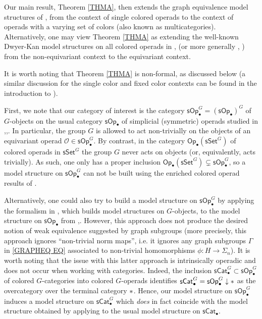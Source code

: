 \documentclass[a4paper,10pt
 ,final
]{article}%
\numberwithin{equation}{section}
\numberwithin{figure}{section}
\theoremstyle{definition} %
\renewcommand{\O}{\ensuremath{\mathcal O}}
\newcommand{\1}{\ensuremath{\mathbbm 1}}%
\begin{document}
Our main result, Theorem \ref{THMA}, 
then extends the graph equivalence model structures of
\cite[Thm. I]{BP_geo}, \cite[Thm. 3.1]{GW18}
from the context of single colored operads 
to the context of operads with a varying set of colors
(also known as multicategories).
Alternatively, one may view Theorem \ref{THMA} as extending the well-known Dwyer-Kan model structures on all colored operads
in \cite[Thm 1.14]{CM13b}, \cite[Thm. 2]{Rob} (or more generally \cite{Cav}, \cite{Yau})
from the non-equivariant context to the 
equivariant context.


It is worth noting that 
Theorem \ref{THMA} is non-formal,
as discussed below
(a similar discussion for the 
single color and fixed color contexts
can be found in the introduction to \cite{BP_FCOP}).

First,
we note that our category of interest
is the category 
$\mathsf{sOp}^G_{\bullet}=
\left(\mathsf{sOp}_{\bullet}\right)^G$
of $G$-objects on the usual category
$\mathsf{sOp}_{\bullet}$
of simplicial (symmetric) operads studied in 
\cite{CM13b},\cite{Rob},\cite{Cav}.
In particular, the group $G$ is allowed to act non-trivially
on the objects of an equivariant operad
$\O \in \mathsf{sOp}^G_{\bullet}$.
%
By contrast, in the category
$\mathsf{Op}_{\bullet}(\mathsf{sSet}^G)$
of colored operads in $\mathsf{sSet}^G$
the group $G$ never acts on objects (or, equivalently, acts trivially).
As such, one only has a proper inclusion
$\mathsf{Op}_{\bullet}(\mathsf{sSet}^G)
\subsetneq \mathsf{sOp}_{\bullet}^G$,
so a model structure on 
$\mathsf{sOp}_{\bullet}^G$
can not be built using the enriched colored operad results of \cite{Cav}.



Alternatively, one could also try to build a model structure
on $\mathsf{sOp}^G_{\bullet}$
by applying the formalism in
\cite[Prop 2.6]{Ste16},
which builds model structures on $G$-objects,
to the model structure on $\mathsf{sOp}_\bullet$
from \cite{CM13b},\cite{Rob}.
However, this approach does not produce
the desired notion of weak equivalence suggested by graph subgroups (more precisely, this approach ignores
``non-trivial norm maps'', i.e.
it ignores any graph subgroups $\Gamma$ in \eqref{GRAPHEQ EQ}
associated to non-trivial homomorphisms $\phi\colon H \to \Sigma_n$).
%
It is worth noting that the issue with this latter approach is intrinsically operadic
and does not occur when working with categories.
Indeed, the inclusion
$\mathsf{sCat}^G_{\bullet} \subset 
\mathsf{sOp}^G_{\bullet}$
of colored $G$-categories into 
colored $G$-operads identifies
$\mathsf{sCat}^G_{\bullet} = 
\mathsf{sOp}^G_{\bullet} \downarrow \**$
as the overcategory over the terminal category $\**$.
Hence, our model structure on 
$\mathsf{sOp}^G_{\bullet}$
induces a model structure on 
$\mathsf{sCat}^G_{\bullet}$ which \emph{does}
in fact coincide with the model structure obtained by applying
\cite[Prop. 2.6]{Ste16}
to the usual model structure on $\mathsf{sCat}_{\bullet}$.
\end{document}
